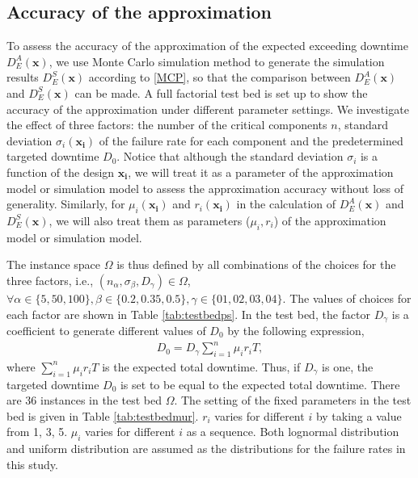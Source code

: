 \documentclass[preprint,12pt]{elsarticle}
\begin{document}
\subsection{Accuracy of the approximation}
To assess the accuracy of the approximation of the expected exceeding downtime $D_{E}^{A}(\boldsymbol{x})$, we use Monte Carlo simulation method to generate the simulation results $D_{E}^{S}(\boldsymbol{x})$ according to \ref{MCP}, so that the comparison between $D_{E}^{A}(\boldsymbol{x})$ and $D_{E}^{S}(\boldsymbol{x})$ can be made. A full factorial test bed is set up to show the accuracy of the approximation under different parameter settings. We investigate the effect of three factors: the number of the critical components $n$, standard deviation $\sigma_{i}(\boldsymbol{x_i})$ of the failure rate for each component and the predetermined targeted downtime $D_{0}$. Notice that although the standard deviation $\sigma_i$ is a function of the design $\boldsymbol{x_i}$, we will treat it as a parameter of the approximation model or simulation model to assess the approximation accuracy without loss of generality. Similarly, for $\mu_i(\boldsymbol{x_i})$ and $r_i(\boldsymbol{x_i})$ in the calculation of $D_{E}^{A}(\boldsymbol{x})$ and $D_{E}^{S}(\boldsymbol{x})$, we will also treat them as parameters ($\mu_i , r_i$) of the approximation model or simulation model.

The instance space $\Omega$ is thus defined by all combinations of the choices for the three factors, i.e., $(n_{\alpha},\sigma_{\beta},D_{\gamma}) \in \Omega$, $\forall \alpha \in \{5,50,100\}, \beta \in \{0.2,0.35,0.5\}, \gamma \in \{01,02,03,04\}$. The values of choices for each factor are shown in Table \ref{tab:testbedps}. In the test bed, the factor $D_{\gamma}$ is a coefficient to generate different values of $D_0$ by the following expression,
 \begin{eqnarray}
 D_{0} = D_{\gamma}\sum_{i=1}^{n}{\mu_{i} r_{i} T}, \label{D0}
\end{eqnarray}
where $\sum_{i=1}^{n}{\mu_{i} r_{i} T}$ is the expected total downtime. Thus, if $D_{\gamma}$ is one, the targeted downtime $D_0$ is set to be equal to the expected total downtime.
There are 36 instances in the test bed $\Omega$. The setting of the fixed parameters in the test bed is given in Table \ref{tab:testbedmur}. $r_{i}$ varies for different $i$ by taking a value from {1, 3, 5}. $\mu_{i}$ varies for different $i$ as a sequence. Both lognormal distribution and uniform distribution are assumed as the distributions for the failure rates in this study.
\end{document}
